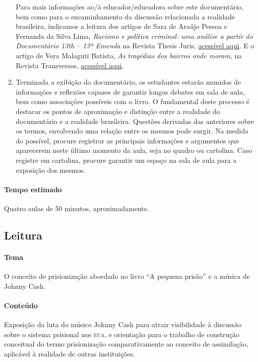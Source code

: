 \documentclass[11pt]{extarticle}
\begin{document}
\begin{enumerate}
Para mais informações ao/à educador/educadora sobre este documentário, bem
como para o encaminhamento da discussão relacionada a realidade
brasileira, indicamos a leitura dos artigos de Sara de Araújo Pessoa e 
Fernanda da Silva Lima, \emph{Racismo e política criminal: uma análise a
partir do Documentário 13th -- 13ª Emenda} na Revista Thesis Juris, 
\href{https://doi.org/10.5585/rtj.v8i2.10763}{acessível aqui}. E o artigo de Vera Malaguti Batista, \emph{As tragédias dos bairros onde
moram}, na Revista Transversos, \href{https://www.e-publicacoes.uerj.br/index.php/transversos/article/view/33656}{acessível aqui}.

\item Terminada a exibição do documentário, os estudantes estarão munidos de
informações e reflexões capazes de garantir longos debates em sala de
aula, bem como associações possíveis com o livro. O fundamental deste
processo é destacar os pontos de aproximação e distinção entre a
realidade do documentário e a realidade brasileira. Questões derivadas
das anteriores sobre os termos, envolvendo uma relação entre os mesmos
pode surgir. Na medida do possível, procure registrar as principais
informações e argumentos que aparecerem neste último momento da aula,
seja no quadro ou cartolina. Caso registre em cartolina, procure
garantir um espaço na sala de aula para a exposição dos mesmos.
\end{enumerate}


\paragraph{Tempo estimado} Quatro aulas de 50 minutos, aproximadamente.

\subsection{Leitura}

\paragraph{Tema} O conceito de prisionização abordado no livro ``A pequena
prisão'' e a música de Johnny Cash.

\paragraph{Conteúdo} Exposição da luta do músico Johnny Cash para atrair
visibilidade à discussão sobre o sistema prisional nos \textsc{eua}, e orientação
para o trabalho de construção conceitual do termo prisionização
comparativamente ao conceito de assimilação, aplicável à realidade de
outras instituições.
\end{document}
